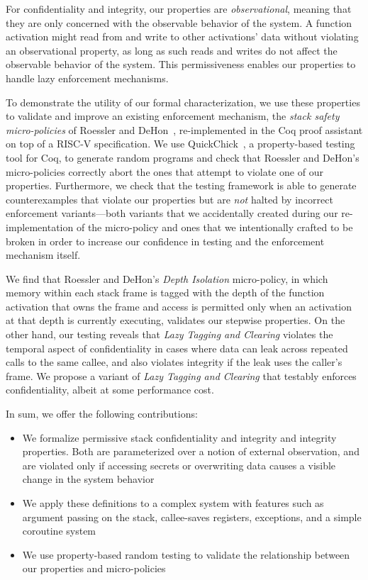 \documentclass[10pt,conference]{ieeetran}%
\theoremstyle{definition}
\begin{document}
For confidentiality and integrity, our properties are {\em observational},
meaning that they are only concerned with the observable behavior of the system.
A function activation might read from and write to other activations' data
without violating an observational property, as long as such reads and writes do not
affect the observable behavior of the
system. This permissiveness enables our properties to handle lazy enforcement mechanisms.

To demonstrate the utility of our formal characterization, we use these
properties to validate and improve an existing enforcement mechanism, the
{\em stack safety micro-policies} of Roessler and DeHon~\cite{DBLP:conf/sp/RoesslerD18}, re-implemented
in the Coq proof assistant on top of a RISC-V specification.  We
use QuickChick~\cite{Denes:VSL2014,Pierce:SF4}, a property-based testing
tool for Coq, to generate random programs and check
that Roessler and DeHon's micro-policies correctly abort the ones that
attempt to violate one of our properties. Furthermore, we
%
check that the testing framework is able to generate counterexamples
that violate our properties but are \emph{not} halted by incorrect
enforcement variants---both variants that we accidentally created
during our re-implementation of the micro-policy and ones that we
intentionally crafted to be broken in order to increase our confidence
in testing and the enforcement mechanism itself.

We find that Roessler and DeHon's {\em Depth Isolation} micro-policy, in
which memory within each stack frame is tagged with the depth of
the function activation that owns the frame and access is
permitted only when an activation at that depth is currently executing, validates our
stepwise properties. On the other hand, our testing reveals that \emph{Lazy Tagging and Clearing}
violates the temporal aspect of confidentiality in
cases where data can leak across repeated calls to the same callee,
and also violates integrity if the leak uses the caller's frame. We
propose a variant of {\em Lazy Tagging and Clearing} that testably enforces
confidentiality, albeit at some performance cost.

In sum, we offer the following contributions:

\begin{itemize}
\item We formalize permissive stack confidentiality and integrity and integrity properties.
  Both are parameterized over a notion of external
  observation, and are violated only if accessing secrets or overwriting
  data causes a visible change in the system behavior %
\item We apply these definitions to a complex system with features such as argument passing
  on the stack, callee-saves registers, exceptions, and a simple coroutine system%
\item We use property-based random testing to validate the relationship between
  our properties and micro-policies %
\end{itemize}
\end{document}
